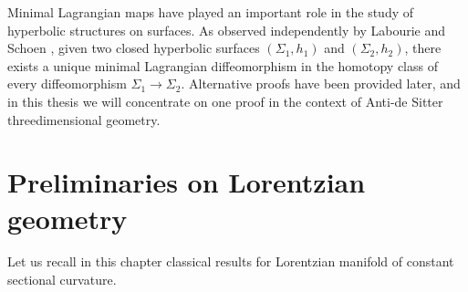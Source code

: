 \documentclass[10pt,a4paper,oneside,reqno]{book}
\theoremstyle{plain}
\theoremstyle{definition}
\theoremstyle{plain}
\theoremstyle{plain}
\theoremstyle{mystyleNormalFont}
\begin{document}


Minimal Lagrangian maps have played an important role in the study of hyperbolic
structures on surfaces. As observed independently by Labourie and Schoen
, given two closed hyperbolic surfaces $(\Sigma_1, h_1)$ and $(\Sigma_2, h_2)$, there exists a unique minimal Lagrangian diffeomorphism in the homotopy class of every diffeomorphism $\Sigma_1 \to \Sigma_2$.
Alternative proofs have been provided later, and in this thesis we will concentrate on one proof in the context of Anti-de Sitter threedimensional geometry.
\chapter{Preliminaries on Lorentzian geometry}

Let us recall in this chapter classical results for Lorentzian manifold of constant sectional curvature.
\end{document}
